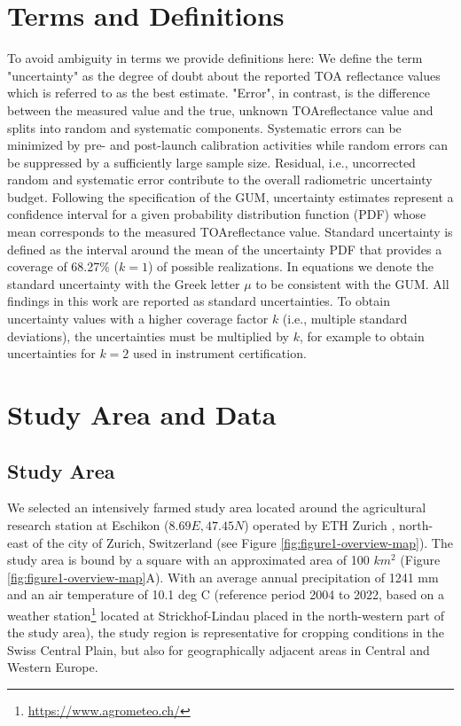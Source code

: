 \section{Terms and Definitions}
\label{sec:terms-and-definitions}
To avoid ambiguity in terms we provide definitions here: We define the term "uncertainty" as the degree of doubt about the reported \gls{TOA} reflectance values which is referred to as the best estimate. "Error", in contrast, is the difference between the measured value and the true, unknown \gls{TOA}reflectance value and splits into random and systematic components. Systematic errors can be minimized by pre- and post-launch calibration activities \citep{wyatt_radiometric_1978} while random errors can be suppressed by a sufficiently large sample size. Residual, i.e., uncorrected random and systematic error contribute to the overall radiometric uncertainty budget. Following the specification of the GUM, uncertainty estimates represent a confidence interval for a given probability distribution function (PDF) whose mean corresponds to the measured \gls{TOA}reflectance value. Standard uncertainty is defined as the interval around the mean of the uncertainty PDF that provides a coverage of 68.27\% ($k=1$) of possible realizations. In equations we denote the standard uncertainty with the Greek letter $\mu$ to be consistent with the GUM. All findings in this work are reported as standard uncertainties. To obtain uncertainty values with a higher coverage factor $k$ (i.e., multiple standard deviations), the uncertainties must be multiplied by $k$, for example to obtain uncertainties for $k=2$ used in instrument certification.

\section{Study Area and Data}
\label{sec:studyarea_data}
\subsection{Study Area}
We selected an intensively farmed study area located around the agricultural research station at Eschikon ($8.69 E, 47.45 N$) operated by ETH Zurich , north-east of the city of Zurich, Switzerland (see Figure \ref{fig:figure1-overview-map}). The study area is bound by a square with an approximated area of 100 $km^2$ (Figure \ref{fig:figure1-overview-map}A). With an average annual precipitation of 1241 mm and an air temperature of 10.1 deg C (reference period 2004 to 2022, based on a weather station\footnote{\url{https://www.agrometeo.ch/}} located at Strickhof-Lindau placed in the north-western part of the study area), the study region is representative for cropping conditions in the Swiss Central Plain, but also for geographically adjacent areas in Central and Western Europe.

